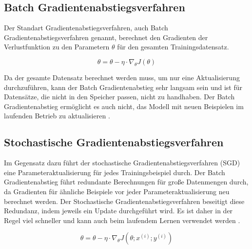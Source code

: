         \subsection{Batch Gradientenabstiegsverfahren}
        Der Standart Gradientenabstiegsverfahren, auch Batch Gradientenabstiegsverfahren genannt, berechnet den Gradienten der Verlustfunktion zu den Parametern $\theta$ für den gesamten Trainingsdatensatz.


        \begin{equation} \label{FormelGradBatch}
            \theta = \theta - \eta \cdot \nabla_{\theta}J(\theta)
        \end{equation}

        Da der gesamte Datensatz berechnet werden muss, um nur eine Aktualisierung durchzuführen, kann der Batch Gradientenabstieg sehr langsam sein und ist für Datensätze, die nicht in den Speicher passen, nicht zu handhaben. Der Batch Gradientenabstieg ermöglicht es auch nicht, das Modell mit neuen Beispielen im laufenden Betrieb zu aktualisieren \cite*{Ruder2016}.

        \subsection{Stochastische Gradientenabstiegsverfahren}

        Im Gegensatz dazu führt der stochastische Gradientenabstiegsverfahren (SGD) eine Parameteraktualisierung für jedes Trainingsbeispiel durch. Der Batch Gradientenabstieg führt redundante Berechnungen für große Datenmengen durch, da Gradienten für ähnliche Beispiele vor jeder Parameteraktualisierung neu berechnet werden. Der Stochastische Gradientenabstiegsverfahren beseitigt diese Redundanz, indem jeweils ein Update durchgeführt wird. Es ist daher in der Regel viel schneller und kann auch beim laufendem Lernen verwendet werden \cite*{Ruder2016}.

        \begin{equation} \label{FormelGradStoch}
            \theta = \theta - \eta \cdot \nabla_{\theta}J(\theta;x^{(i)};y^{(i)})
        \end{equation}



